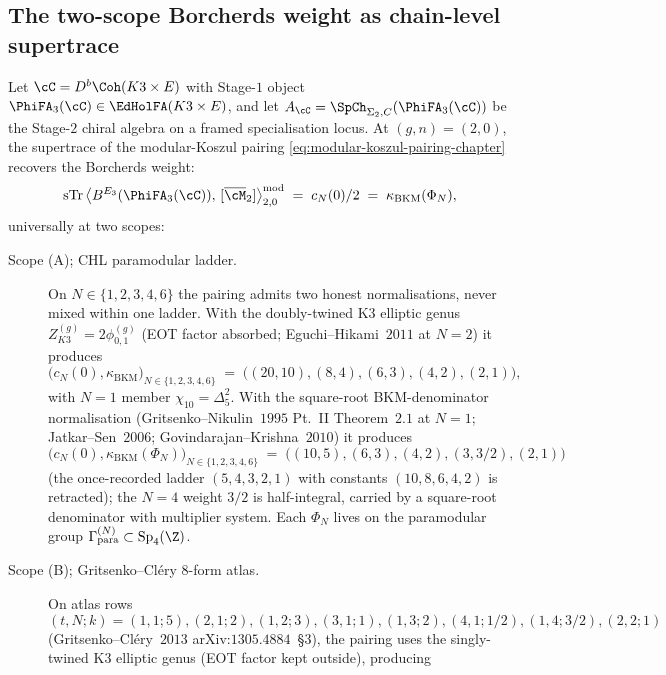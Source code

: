 \subsection{The two-scope Borcherds weight as chain-level supertrace}

\begin{theorem}[Chain-level modular-Koszul bridge at $d = 3$, two scopes]
\label{thm:modular-koszul-bridge-d3-two-scopes}
Let $\cC = D^b\Coh(K3 \times E)$ with Stage-$1$ object
$\PhiFA_3(\cC) \in \EdHolFA(K3 \times E)$, and let
$A_\cC = \SpCh_{\Sigma_2, C}(\PhiFA_3(\cC))$ be the Stage-$2$ chiral
algebra on a framed specialisation locus. At $(g, n) = (2, 0)$, the
supertrace of the modular-Koszul pairing
\eqref{eq:modular-koszul-pairing-chapter} recovers the Borcherds
weight:
\begin{equation}
\label{eq:kBKM-chain-level-two-scopes}
 \mathrm{sTr}\,\bigl\langle B^{E_3}(\PhiFA_3(\cC)),\,
 [\overline{\cM}_2]\bigr\rangle^{\mathrm{mod}}_{2, 0}
 \;=\; c_N(0)/2 \;=\; \kappa_{\mathrm{BKM}}(\Phi_N),
\end{equation}
universally at two scopes:
\begin{description}
\item[Scope (A); CHL paramodular ladder.]
On $N \in \{1, 2, 3, 4, 6\}$ the pairing admits two honest
normalisations, never mixed within one ladder. With the doubly-twined
K3 elliptic genus $Z^{(g)}_{K3} = 2 \phi^{(g)}_{0, 1}$ (EOT factor
absorbed; Eguchi--Hikami~$2011$ at $N = 2$) it produces
\[
 \bigl(c_N(0), \kappa_{\mathrm{BKM}}\bigr)_{N \in \{1, 2, 3, 4, 6\}}
 \;=\; \bigl((20, 10), (8, 4), (6, 3), (4, 2), (2, 1)\bigr),
\]
with $N = 1$ member $\chi_{10} = \Delta_5^2$. With the square-root
BKM-denominator normalisation (Gritsenko--Nikulin~$1995$ Pt.~II
Theorem~$2.1$ at $N = 1$; Jatkar--Sen~$2006$;
Govindarajan--Krishna~$2010$) it produces
\[
 \bigl(c_N(0), \kappa_{\mathrm{BKM}}(\Phi_N)\bigr)_{N \in \{1, 2, 3, 4, 6\}}
 \;=\; \bigl((10, 5), (6, 3), (4, 2), (3, 3/2), (2, 1)\bigr)
\]
(the once-recorded ladder $(5, 4, 3, 2, 1)$ with constants
$(10, 8, 6, 4, 2)$ is retracted); the $N = 4$ weight $3/2$ is
half-integral, carried by a square-root denominator with multiplier
system. Each $\Phi_N$ lives on the paramodular group
$\Gamma^{(N)}_{\mathrm{para}} \subset \mathrm{Sp}_4(\Z)$.
\item[Scope (B); Gritsenko--Cl\'ery $8$-form atlas.]
On atlas rows
\[
(t,N;k)=(1,1;5),(2,1;2),(1,2;3),(3,1;1),
(1,3;2),(4,1;1/2),(1,4;3/2),(2,2;1)
\]
(Gritsenko--Cl\'ery~$2013$ arXiv:$1305.4884$~\S$3$), the pairing uses
the singly-twined K3 elliptic genus (EOT factor kept outside), producing

\end{description}
\end{theorem}
